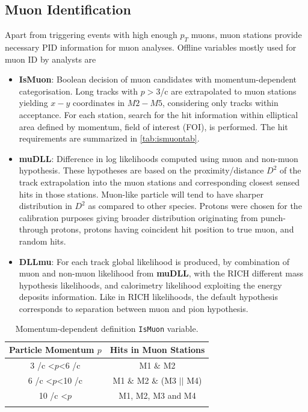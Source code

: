 \subsection{Muon Identification}
\label{muonID}
Apart from triggering events with high enough $p_{T}$ muons, muon stations provide necessary PID information for muon analyses. Offline variables mostly used for muon ID by analysts are
\begin{itemize}
	\item{\textbf{IsMuon}: Boolean decision of muon candidates with momentum-dependent categorisation. Long tracks with $p>3$\gev/c are extrapolated to muon stations yielding $x-y$ coordinates in $M2-M5$, considering only tracks within acceptance. For each station, search for the hit information within elliptical area defined by momentum, field of interest (\Gls{FOI}), is performed. The hit requirements are summarized in \autoref{tab:ismuontab}.}
	\item{\textbf{muDLL}: Difference in log likelihoods computed using muon and non-muon hypothesis. These hypotheses are based on the proximity/distance $D^{2}$ of the track extrapolation into the muon stations and corresponding closest sensed hits in those stations. Muon-like particle will tend to have sharper distribution in $D^{2}$ as compared to other species. Protons were chosen for the calibration purposes giving broader distribution originating from punch-through protons, protons having coincident hit position to true muon, and random hits.}
	\item{\textbf{DLLmu}}:  For each track global likelihood is produced, by combination of muon and non-muon likelihood from \textbf{muDLL}, with the \Gls{RICH} different mass hypothesis likelihoods, and calorimetry likelihood exploiting the energy deposits information. Like in \Gls{RICH} likelihoods, the default hypothesis corresponds to separation between muon and pion hypothesis.    

\end{itemize}


\begin{table}[!h]
	\centering
	\hspace*{-0.8cm}
	\begin{tabular}{c c}
		\hline
		Particle Momentum $p$  & Hits in Muon Stations \\ \hline
		3 \gev/c <$p$<6 \gev/c & M1 $\&$ M2\\
		6 \gev/c <$p$<10 \gev/c & M1 $\&$ M2 $\&$ (M3 $||$ M4) \\
		10 \gev/c <$p$ & M1, M2, M3 and M4 \\ \\\hline      
	\end{tabular}
	\caption{Momentum-dependent definition \texttt{IsMuon} variable.}
	\label{tab:ismuontab}
\end{table}   

